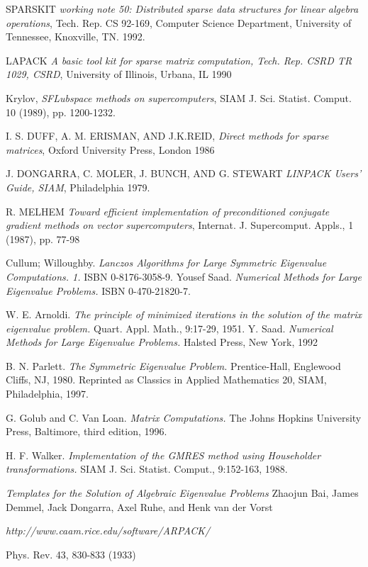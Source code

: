 \documentclass[a4paper,openright,12pt, oneside]{book}
\begin{document}
\begin{thebibliography}{X}

  SPARSKIT 
  \emph{working note 50: Distributed sparse data structures for linear algebra operations},
  Tech. Rep. CS 92-169, Computer Science Department, University of Tennessee, Knoxville, TN.
  1992.

  LAPACK 
  \emph{A basic tool kit for sparse matrix computation, Tech. Rep. CSRD TR 1029, CSRD},
  University of Illinois, Urbana, IL
  1990

  Krylov,
  \emph{SFLubspace methods on supercomputers},
  SIAM J. Sci. Statist. Comput.
  10 (1989), pp. 1200-1232.

  I. S. DUFF, A. M. ERISMAN, AND J.K.REID,
  \emph{Direct methods for sparse matrices},
  Oxford University Press, London
  1986

  J. DONGARRA, C. MOLER, J. BUNCH, AND G. STEWART
  \emph{LINPACK Users' Guide, SIAM},
  Philadelphia
  1979.

  R. MELHEM
  \emph{Toward efficient implementation of preconditioned conjugate gradient methods on vector supercomputers},
  Internat. J. Supercomput. Appls., 1 (1987), pp. 77-98

  Cullum; Willoughby. 
  \emph{Lanczos Algorithms for Large Symmetric Eigenvalue Computations. 1.} 
  ISBN 0-8176-3058-9.
  Yousef Saad. 
  \emph{Numerical Methods for Large Eigenvalue Problems.} 
  ISBN 0-470-21820-7.

    W. E. Arnoldi. 
    \emph{The principle of minimized iterations in the solution of the matrix eigenvalue problem.} 
    Quart. Appl. Math., 9:17-29, 1951.
    Y. Saad. 
    \emph{Numerical Methods for Large Eigenvalue Problems.}
    Halsted Press, New York, 1992

    B. N. Parlett. 
    \emph{The Symmetric Eigenvalue Problem.}
    Prentice-Hall, Englewood Cliffs, NJ, 1980. 
    Reprinted as Classics in Applied Mathematics 20, SIAM, Philadelphia, 1997.

    G. Golub and C. Van Loan. 
    \emph{Matrix Computations.}
    The Johns Hopkins University Press, Baltimore, third edition, 1996.

    H. F. Walker. 
    \emph{Implementation of the GMRES method using Householder transformations.}
    SIAM J. Sci. Statist. Comput., 9:152-163, 1988.

    \emph{Templates for the Solution of Algebraic Eigenvalue Problems}
    Zhaojun Bai, James Demmel, Jack Dongarra, Axel Ruhe, and Henk van der Vorst

    \emph{http://www.caam.rice.edu/software/ARPACK/}

    Phys. Rev. 43, 830-833 (1933)

\end{thebibliography}
\end{document}
